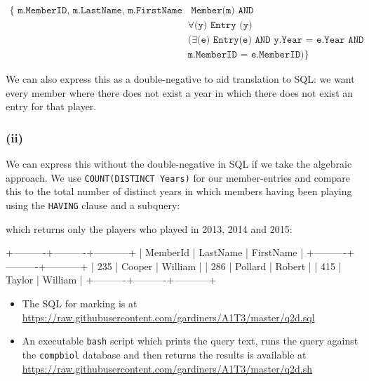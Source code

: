 \documentclass{article}
\begin{document}
$$
\begin{aligned}
\{
\texttt{ m.MemberID, m.LastName, m.FirstName |} &\texttt{ Member(m) AND }\\
&\forall \texttt{(y) Entry (y)}\\
&(\exists \texttt{(e) Entry(e) AND y.Year = e.Year AND}\\
&\texttt{m.MemberID = e.MemberID})
\}
\end{aligned}
$$

We can also express this as a double-negative to aid translation to SQL: we want every member where there does not exist a year in which there does not exist an entry for that player.

\subsubsection{(ii)}

We can express this without the double-negative in SQL if we take the algebraic approach. We use \texttt{COUNT(DISTINCT Years)} for our member-entries and compare this to the total number of distinct years in which members having been playing using the \texttt{HAVING} clause and a subquery:


which returns only the players who played in 2013, 2014 and 2015:

\begin{bashinline}
+----------+----------+-----------+
| MemberId | LastName | FirstName |
+----------+----------+-----------+
|      235 | Cooper   | William   |
|      286 | Pollard  | Robert    |
|      415 | Taylor   | William   |
+----------+----------+-----------+
\end{bashinline}

\begin{itemize}
    \item The SQL for marking is at \url{https://raw.githubusercontent.com/gardiners/A1T3/master/q2d.sql}
    \item An executable \texttt{bash} script which prints the query text, runs the query against the \texttt{compbiol} database and then returns the results is available at \url{https://raw.githubusercontent.com/gardiners/A1T3/master/q2d.sh}
\end{itemize}
\end{document}

